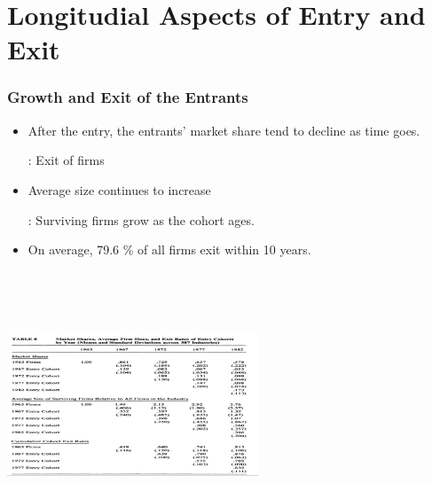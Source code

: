 \documentclass[dvipdfmx,12pt]{beamer}
\begin{document}
\section{Longitudial Aspects of Entry and Exit}
\begin{frame}\frametitle{Growth and Exit of the Entrants}

 \begin{itemize}
 
  \item After the entry, the entrants' market share tend to decline as time goes.
  
  : Exit of firms
  
  \item Average size continues to increase
  
  : Surviving firms grow as the cohort ages.
 
 \item On average, 79.6 \% of all firms exit within 10 years.
 
 \end{itemize}

\end{frame}

\begin{frame}

\begin{center}

\includegraphics[width=7.5cm,height=8cm]{DRS_T8.pdf}

\end{center}

\end{frame}
\end{document}
